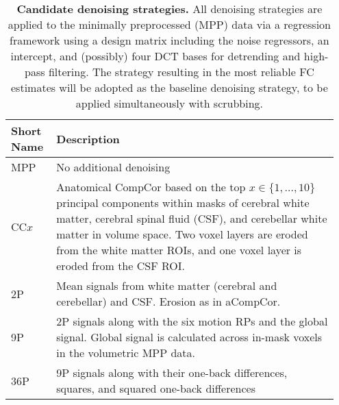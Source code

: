 \documentclass{article}
\begin{document}
\begin{table}
\small
    \centering
    \begin{tabular}{@{}p{0.13\linewidth}|p{0.82\linewidth}@{}}
    \textbf{Short Name} & \textbf{Description} \\
    \hline
         MPP & No additional denoising \\    \hline

         CC$x$ & Anatomical CompCor based on the top $x\in\{1,\dots,10\}$ principal components within masks of cerebral white matter, cerebral spinal fluid (CSF), and cerebellar white matter in volume space. Two voxel layers are eroded from the white matter ROIs, and one voxel layer is eroded from the CSF ROI. \\    \hline

         2P & Mean signals from white matter (cerebral and cerebellar) and CSF. Erosion as in aCompCor. \\    \hline

         9P & 2P signals along with the six motion RPs and the global signal.  Global signal is calculated across in-mask voxels in the volumetric MPP data. \\    \hline

         36P & 9P signals along with their one-back differences, squares, and squared one-back differences \\     \hline
         
         
    \end{tabular}
    \caption{\small \textbf{Candidate denoising strategies.} All denoising strategies are applied to the minimally preprocessed (MPP) data via a regression framework using a design matrix including the noise regressors, an intercept, and (possibly) four DCT bases for detrending and high-pass filtering. The strategy resulting in the most reliable FC estimates will be adopted as the baseline denoising strategy, to be applied simultaneously with scrubbing.}
    \label{tab:denoising}
\end{table}
\end{document}
